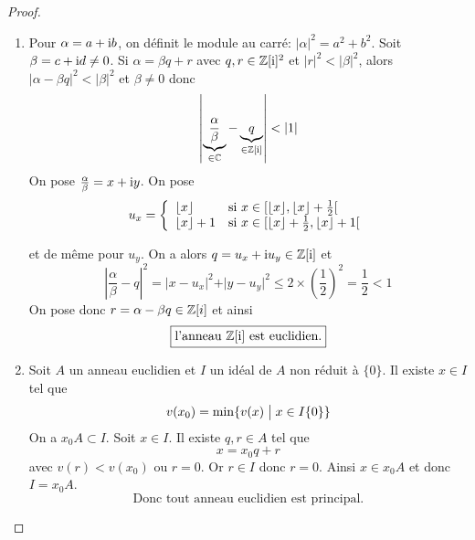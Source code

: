 \begin{proof}
	\phantom{}
	\begin{enumerate}
		\item Pour $\alpha=a+\mathrm{i} b$, on définit le module au carré: $\vert\alpha\vert^{2}=a^{2}+b^{2}$. Soit $\beta=c+\mathrm{i} d\neq0$. Si $\alpha=\beta q+r$ avec $q,r\in\mathbb{Z}[\mathrm{i}]^{2}$ et $\vert r\vert^{2}<\vert \beta\vert^{2}$, alors $\vert\alpha-\beta q\vert^{2}<\vert\beta\vert^{2}$ et $\beta\neq0$ donc
		\begin{equation}
			\left\vert\underbrace{\frac{\alpha}{\beta}}_{\in\mathbb{C}}-\underbrace{q}_{\in\mathbb{Z}[\mathrm{i}]}\right\vert<\vert 1\vert
		\end{equation}
		On pose $\frac{\alpha}{\beta}=x+\mathrm{i} y$. On pose 
		\begin{equation}
			u_{x}=
			\left\{
				\begin{array}[]{ll}
					\lfloor x\rfloor & \text{si }x\in[\lfloor x\rfloor,\lfloor x\rfloor+\frac{1}{2}[\\
					\lfloor x\rfloor+1 & \text{si }x\in[\lfloor x\rfloor+\frac{1}{2},\lfloor x\rfloor+1[
				\end{array}
			\right.
		\end{equation}

		et de même pour $u_{y}$. On a alors $q=u_{x}+\mathrm{i} u_{y}\in\mathbb{Z}[\mathrm{i}]$ et 
		\begin{equation}
			\left\vert\frac{\alpha}{\beta}-q\right\vert^{2}=\vert x-u_{x}\vert^{2}+\vert y-u_{y}\vert^{2}\leqslant2\times \left(\frac{1}{2}\right)^{2}=\frac{1}{2}<1
		\end{equation}
		On pose donc $r=\alpha-\beta q\in\mathbb{Z}[i]$ et ainsi 
		\begin{equation}
			\boxed{\text{l'anneau }\mathbb{Z}[\mathrm{i}]\text{ est euclidien.}}
		\end{equation}

		\item Soit $A$ un anneau euclidien et $I$ un idéal de $A$ non réduit à $\{0\}$. Il existe $x\in I$ tel que 
		\begin{equation}
			v(x_{0})=\min\{v(x)\bigm| x\in I\{0\}\}
		\end{equation}
		On a $x_{0}A\subset I$. Soit $x\in I$. Il existe $q,r\in A$ tel que 
		\begin{equation}
			x=x_{0}q+r
		\end{equation}
		avec $v(r)<v(x_{0})$ ou $r=0$. Or $r\in I$ donc $r=0$. Ainsi $x\in x_{0}A$ et donc $I=x_{0}A$. 
		\begin{equation}
			\boxed{\text{Donc tout anneau euclidien est principal.}}
		\end{equation}
	\end{enumerate}
\end{proof}

